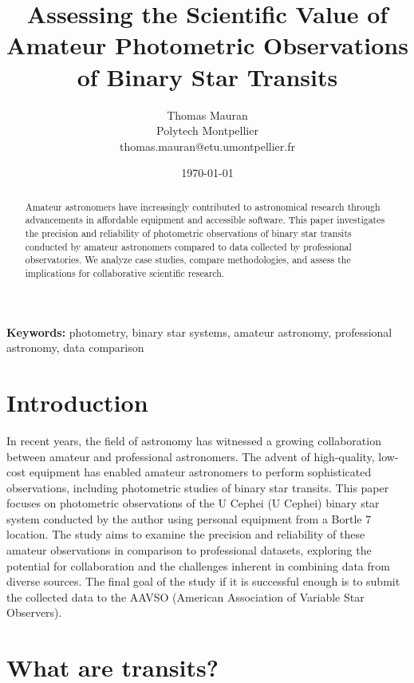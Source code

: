 \documentclass[12pt,a4paper]{article}
\title{Assessing the Scientific Value of Amateur Photometric Observations of Binary Star Transits}
\author{Thomas Mauran \\\small Polytech Montpellier  \\\small thomas.mauran@etu.umontpellier.fr}
\date{\today}
\begin{document}
\maketitle

\begin{abstract}
Amateur astronomers have increasingly contributed to astronomical research through advancements in affordable equipment and accessible software. This paper investigates the precision and reliability of photometric observations of binary star transits conducted by amateur astronomers compared to data collected by professional observatories. We analyze case studies, compare methodologies, and assess the implications for collaborative scientific research.
\end{abstract}

\textbf{Keywords:} photometry, binary star systems, amateur astronomy, professional astronomy, data comparison

\newpage

\tableofcontents

\newpage

\section{Introduction}
In recent years, the field of astronomy has witnessed a growing collaboration between amateur 
and professional astronomers. The advent of high-quality, low-cost equipment has enabled 
amateur astronomers to perform sophisticated observations, including photometric studies of 
binary star transits. This paper focuses on photometric observations of the U Cephei 
(U Cephei) binary star system conducted by the author using personal equipment from a 
Bortle 7 location. The study aims to examine the precision and reliability of these amateur 
observations in comparison to professional datasets, exploring the potential for collaboration
and the challenges inherent in combining data from diverse sources. The final goal of the study if it is 
successful enough is to submit the collected data to the AAVSO (American Association of Variable Star Observers).

\section{What are transits?}
\end{document}
